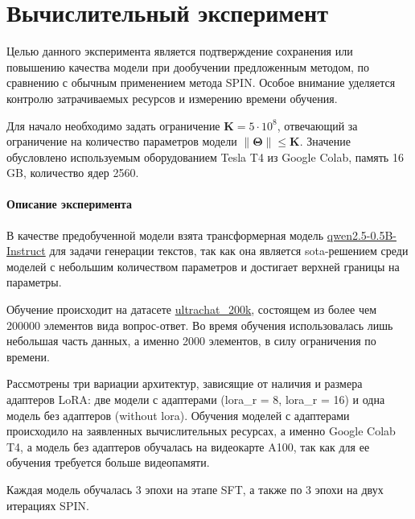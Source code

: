 \documentclass[12pt, twoside]{article}
\newcommand{\bTheta}{\boldsymbol{\Theta}}
\begin{document}
\vspace{10}

\section{Вычислительный эксперимент}

Целью данного эксперимента является подтверждение сохранения или повышению качества модели при дообучении предложенным методом, по сравнению с обычным применением метода SPIN. Особое внимание уделяется контролю затрачиваемых ресурсов и измерению времени обучения.

Для начало необходимо задать ограничение $\mathbf{K} = 5\cdot10^8$, отвечающий за ограничение на количество параметров модели $\| \bTheta\| \le \mathbf{K}$. Значение обусловлено используемым оборудованием Tesla T4 из Google Colab, память 16 GB, количество ядер 2560. 

\paragraph{Описание эксперимента}
В качестве предобученной модели взята трансформерная модель \href{https://huggingface.co/Qwen/Qwen2.5-0.5B-Instruct}{qwen2.5-0.5B-Instruct} для задачи генерации текстов, так как она является sota-решением среди моделей с небольшим количеством параметров и достигает верхней границы на параметры.

Обучение происходит на датасете \href{https://huggingface.co/datasets/HuggingFaceH4/ultrachat_200k}{ultrachat\_200k}, состоящем из более чем 200000 элементов вида вопрос-ответ. Во время обучения использовалась лишь небольшая часть данных, а именно 2000 элементов, в силу ограничения по времени.

Рассмотрены три вариации архитектур, зависящие от наличия и размера адаптеров LoRA: две модели с адаптерами (lora\_r = 8, lora\_r = 16) и одна модель без адаптеров (without lora). Обучения моделей с адаптерами происходило на заявленных вычислительных ресурсах, а именно Google Colab T4, а модель без адаптеров обучалась на видеокарте A100, так как для ее обучения требуется больше видеопамяти. 

Каждая модель обучалась 3 эпохи на этапе SFT, а также по 3 эпохи на двух итерациях SPIN.
\end{document}
